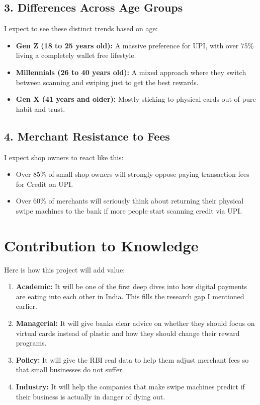 \subsection{3. Differences Across Age Groups}

I expect to see these distinct trends based on age:

\begin{itemize}
    \item \textbf{Gen Z (18 to 25 years old):} A massive preference for UPI, with over 75\% living a completely wallet free lifestyle.
    \item \textbf{Millennials (26 to 40 years old):} A mixed approach where they switch between scanning and swiping just to get the best rewards.
    \item \textbf{Gen X (41 years and older):} Mostly sticking to physical cards out of pure habit and trust.
\end{itemize}

\subsection{4. Merchant Resistance to Fees}

I expect shop owners to react like this:

\begin{itemize}
    \item Over 85\% of small shop owners will strongly oppose paying transaction fees for Credit on UPI.
    \item Over 60\% of merchants will seriously think about returning their physical swipe machines to the bank if more people start scanning credit via UPI.
\end{itemize}

\section{Contribution to Knowledge}

Here is how this project will add value:

\begin{enumerate}
    \item \textbf{Academic:} It will be one of the first deep dives into how digital payments are eating into each other in India. This fills the research gap I mentioned earlier.
    \item \textbf{Managerial:} It will give banks clear advice on whether they should focus on virtual cards instead of plastic and how they should change their reward programs.
    \item \textbf{Policy:} It will give the RBI real data to help them adjust merchant fees so that small businesses do not suffer.
    \item \textbf{Industry:} It will help the companies that make swipe machines predict if their business is actually in danger of dying out. \\ \\
\end{enumerate}

